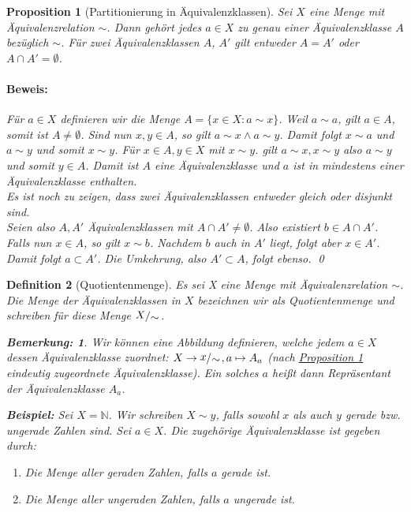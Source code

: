 \documentclass{report}
\newcommand{\IN}[1]{\index{#1|BH}}
\newcommand{\N}{\mathbb{N}}
\theoremstyle{customrem}
\newtheorem*{bemerkung}{Bemerkung\textnormal:}
\theoremstyle{customdef}
\newtheorem{definition}{Definition}[chapter]
\newtheorem{proposition}[definition]{Proposition}
\renewenvironment{proof}{\paragraph{Beweis: }}{\qed}
\newcommand{\bigslant}[2]{{\raisebox{.1em}{$#1$}\hspace{-.2em}\left/\raisebox{-.1em}{$#2$}\right.}}
\begin{document}
	\begin{proposition}[Partitionierung in Äquivalenzklassen]
		\label{prop122}
		Sei $X$ eine Menge mit Äquivalenzrelation $\sim$. Dann gehört jedes $a \in X$ zu genau einer Äquivalenzklasse $A$ bezüglich $\sim$. Für zwei Äquivalenzklassen $A$, $A'$ gilt entweder $A = A'$ oder $A\cap A' = \emptyset$.\\
		\begin{proof}
			Für $a \in X$ definieren wir die Menge $A = \{x \in X : a \sim x\}$.
			Weil $a \sim a$, gilt $a \in A$, somit ist $A \neq \emptyset$. 
			Sind nun $x, y \in A$, so gilt $a \sim x \land a \sim y$. Damit folgt $x \sim a$ und $a \sim y$ und somit $x \sim y$.
			Für $x \in A, y \in X$ mit $x \sim y$. gilt $a \sim x, x \sim y$ also $a \sim y$ und somit $y \in A$.
			Damit ist $A$ eine Äquivalenzklasse und $a$ ist in \textit{mindestens} einer Äquivalenzklasse enthalten.\\[.125cm]
			Es ist noch zu zeigen, dass zwei Äquivalenzklassen entweder gleich oder disjunkt sind.\\
			Seien also $A, A'$ Äquivalenzklassen mit $A \cap A' \neq \emptyset$. Also existiert $b \in A\cap A'$. Falls nun $x \in A$, so gilt $x \sim b$. Nachdem $b$ auch in $A'$ liegt, folgt aber $x \in A'$. Damit folgt $a \subset A'$. Die Umkehrung, also $A' \subset A$, folgt ebenso.
		\end{proof}
	\end{proposition}
	
	\vspace{.25cm}
	
	\begin{definition}[Quotientenmenge]
		\IN{Quotientenmenge}
		Es sei X eine Menge mit Äquivalenzrelation $\sim$. Die Menge der Äquivalenzklassen in $X$ bezeichnen wir  als Quotientenmenge und schreiben für diese Menge $\bigslant{X}{\sim}$.\\
		\begin{bemerkung}
			Wir können eine Abbildung definieren, welche jedem $a \in X$ dessen Äquivalenzklasse zuordnet:
			$X \to \bigslant{x}{\sim}, a \mapsto A_a$ (nach \hyperref[prop122]{Proposition \ref*{prop122}} eindeutig zugeordnete Äquivalenzklasse).
			Ein solches $a$ heißt dann Repräsentant der Äquivalenzklasse $A_a$.\\
		\end{bemerkung}
		\textbf{Beispiel: }
		Sei $X = \N$. Wir schreiben $X \sim y$, falls sowohl $x$ als auch $y$ gerade bzw. ungerade Zahlen sind.
		Sei $a \in X$. Die zugehörige Äquivalenzklasse ist gegeben durch:
		\begin{enumerate}[leftmargin=3cm]
			\itemsep0cm
			\item Die Menge aller geraden Zahlen, falls $a$ gerade ist.
			\item Die Menge aller ungeraden Zahlen, falls $a$ ungerade ist.
		\end{enumerate}
	\end{definition}
	
\end{document}
